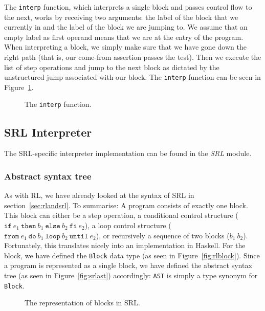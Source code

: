 \noindent The \texttt{interp} function, which interprets a single block and passes control flow to the next, works by receiving two arguments: the label of the block that we currently in and the label of the block we are jumping to. We assume that an empty label as first operand means that we are at the entry of the program. When interpreting a block, we simply make sure that we have gone down the right path (that is, our come-from assertion passes the test). Then we execute the list of step operations and jump to the next block as dictated by the unstructured jump associated with our block. The \texttt{interp} function can be seen in Figure~\ref{fig:interp}.

\begin{figure}[H]
  
  \caption{The \texttt{interp} function.}\label{fig:interp}
\end{figure}

\subsection{SRL Interpreter}

The SRL-specific interpreter implementation can be found in the \textit{SRL} module.

\subsubsection{Abstract syntax tree}

As with RL, we have already looked at the syntax of SRL in section~\ref{sec:rlandsrl}. To summarise: A program consists of exactly one block. This block can either be a step operation, a conditional control structure ($\texttt{if} \ e_1 \ \texttt{then} \ b_1 \ \texttt{else} \ b_2 \ \texttt{fi} \ e_2$), a loop control structure ($\texttt{from} \ e_1 \ \texttt{do} \ b_1 \ \texttt{loop} \ b_2 \ \texttt{until} \ e_2$), or recursively a sequence of two blocks ($b_1 \ b_2$). Fortunately, this translates nicely into an implementation in Haskell. For the block, we have defined the \texttt{Block} data type (as seen in Figure~\ref{fig:rlblock}). Since a program is represented as a single block, we have defined the abstract syntax tree (as seen in Figure~\ref{fig:srlast}) accordingly: \texttt{AST} is simply a type synonym for \texttt{Block}.

\begin{figure}[H]
  
  \caption{The representation of blocks in SRL.}\label{fig:srlblock}
\end{figure}

